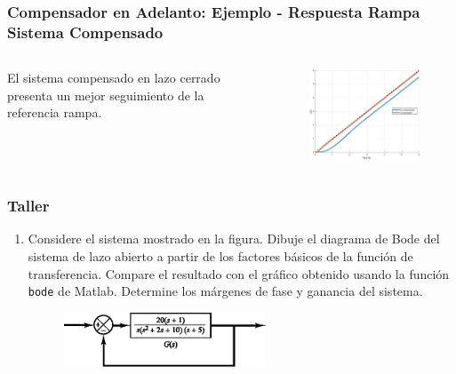\documentclass[aspectratio=169]{beamer}
\theoremstyle{definition}
\theoremstyle{plain}
\theoremstyle{remark}
\newcounter{saveenumi}
\newcommand{\seti}{\setcounter{saveenumi}{\value{enumi}}}
\begin{document}
\begin{frame}[<+->]\frametitle{Compensador en Adelanto: Ejemplo - Respuesta Rampa Sistema Compensado}
\vspace*{-2mm}
\begin{columns}
	\begin{column}{0.3\textwidth}
		El sistema compensado en lazo cerrado presenta un mejor seguimiento de la referencia rampa.
	\end{column}
	\begin{column}{0.7\textwidth}
		\begin{figure}
			\centering
			\includegraphics[width=9cm]{images/bodeLeadCompExampleRamp.eps}
		\end{figure}
	\end{column}
\end{columns}
\end{frame}

\begin{frame}[c]\frametitle{Taller}
\begin{enumerate}
	\item Considere el sistema mostrado en la figura. Dibuje el diagrama de Bode del sistema de lazo abierto a partir de los factores básicos de la función de transferencia. Compare el resultado con el gráfico obtenido usando la función \texttt{bode} de Matlab. Determine los márgenes de fase y ganancia del sistema.
	\begin{figure}
		\centering
		\includegraphics[width=6cm]{images/exercise1.eps}
	\end{figure}
	\seti 
\end{enumerate}
\end{frame}
\end{document}
